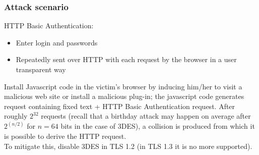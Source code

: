 \documentclass[a4paper, 10pt, titlepage]{article}
\begin{document}
\subsubsection*{Attack scenario}
HTTP Basic Authentication:
\begin{itemize}
\item Enter login and passwords
\item Repeatedly sent over HTTP with each request by the browser in a user transparent way
\end{itemize}
Install Javascript code in the victim’s browser by inducing him/her to visit a malicious web site or install a malicious plug-in; the javascript code generates request containing fixed text + HTTP Basic Authentication request. After roughly $2^{32}$ requests (recall that a birthday attack may happen on average after $2^{(n/2)}$ for $n=64$ bits in the case of 3DES), a collision is produced from which it is possible to derive the HTTP request. \\
To mitigate this, disable 3DES in TLS 1.2 (in TLS 1.3 it is no more supported).
\end{document}
